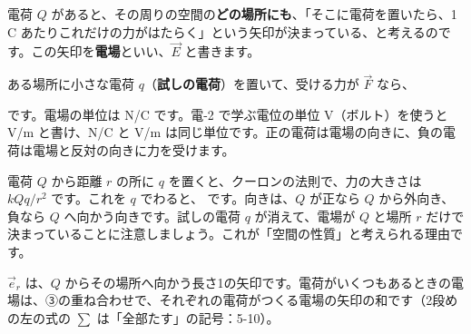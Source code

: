 \noindent\begin{minipage}[c]{0.53\linewidth}\raggedright
電荷 $Q$ があると、その周りの空間の\textbf{どの場所にも}、「そこに電荷を置いたら、1\,C あたりこれだけの力がはたらく」という矢印が決まっている、と考えるのです。この矢印を\textbf{電場}といい、$\vec E$ と書きます。

ある場所に小さな電荷 $q$（\textbf{試しの電荷}）を置いて、受ける力が $\vec F$ なら、
\end{minipage}\hfill
\begin{minipage}[c]{0.44\linewidth}\centering
{}
\end{minipage}
\label{ph:電-1:tenkaba}です。電場の単位は N/C です。電-2 で学ぶ電位の単位 V（ボルト）を使うと V/m と書け、N/C と V/m は同じ単位です。正の電荷は電場の向きに、負の電荷は電場と反対の向きに力を受けます。

電荷 $Q$ から距離 $r$ の所に $q$ を置くと、クーロンの法則で、力の大きさは $kQq/r^2$ です。これを $q$ でわると、
です。向きは、$Q$ が正なら $Q$ から外向き、負なら $Q$ へ向かう向きです。試しの電荷 $q$ が消えて、電場が $Q$ と場所 $r$ だけで決まっていることに注意しましょう。これが「空間の性質」と考えられる理由です。

\begin{phflow}[クーロンの法則から点電荷の電場へ]
\end{phflow}
\noindent $\vec e_r$ は、$Q$ からその場所へ向かう長さ1の矢印です。電荷がいくつもあるときの電場は、③の重ね合わせで、それぞれの電荷がつくる電場の矢印の和です（2段めの左の式の $\sum$ は「全部たす」の記号：5-10）。

